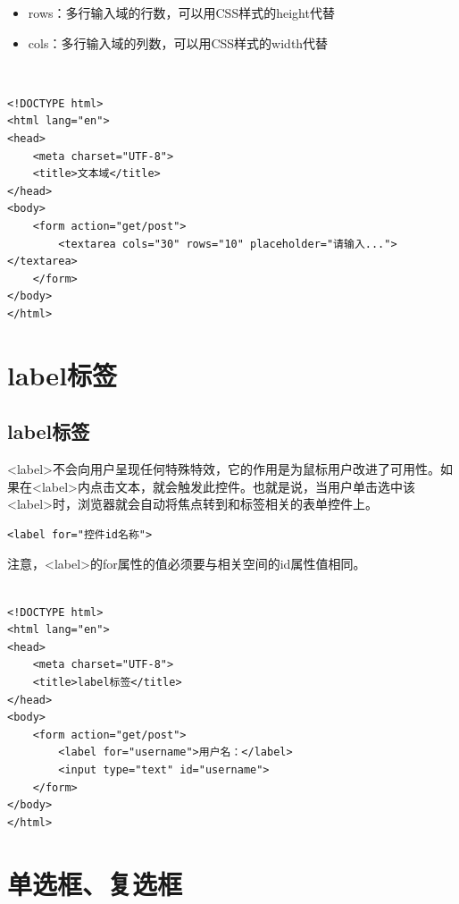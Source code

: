 \begin{itemize}
	\item rows：多行输入域的行数，可以用CSS样式的height代替
	\item cols：多行输入域的列数，可以用CSS样式的width代替
\end{itemize}

 \\
\begin{lstlisting}[style=htmlcssjs]
<!DOCTYPE html>
<html lang="en">
<head>
    <meta charset="UTF-8">
    <title>文本域</title>
</head>
<body>
    <form action="get/post">
        <textarea cols="30" rows="10" placeholder="请输入..."></textarea>
    </form>
</body>
</html>
\end{lstlisting}

\newpage

\section{label标签}

\subsection{label标签}

<label>不会向用户呈现任何特殊特效，它的作用是为鼠标用户改进了可用性。如果在<label>内点击文本，就会触发此控件。也就是说，当用户单击选中该<label>时，浏览器就会自动将焦点转到和标签相关的表单控件上。

\begin{lstlisting}[style=htmlcssjs]
<label for="控件id名称">
\end{lstlisting}

注意，<label>的for属性的值必须要与相关空间的id属性值相同。 \\

 \\
\begin{lstlisting}[style=htmlcssjs]
<!DOCTYPE html>
<html lang="en">
<head>
    <meta charset="UTF-8">
    <title>label标签</title>
</head>
<body>
    <form action="get/post">
        <label for="username">用户名：</label>
        <input type="text" id="username">
    </form>
</body>
</html>
\end{lstlisting}

\newpage

\section{单选框、复选框}

